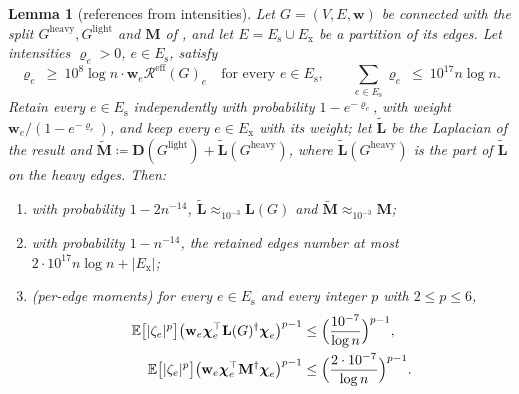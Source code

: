 \documentclass[11pt]{article}
\newtheorem{lemma}[theorem]{Lemma}
\theoremstyle{remark}
\newcommand{\cchi}{{\boldsymbol\chi}}
\newcommand{\DD}{\mathbf D}
\newcommand{\LL}{\mathbf L}
\newcommand{\LLtil}{{\widetilde{\LL}}}
\newcommand{\MM}{\mathbf M}
\newcommand{\MMtil}{{\widetilde{\MM}}}
\newcommand{\ww}{\mathbf w}
\newcommand{\Gh}{G^{\mathrm{heavy}}}
\newcommand{\Gl}{G^{\mathrm{light}}}
\newcommand{\Rcal}{\mathcal{R}}
\newcommand{\Reff}{\Rcal^{\mathrm{eff}}}
\newcommand{\defeq}{\coloneqq}
\newcommand{\Ex}{\mathbb E}
\begin{document}
\begin{lemma}[references from intensities]\label{lem:bernoulli}
Let $G=(V,E,\ww)$ be connected with the split $\Gh,\Gl$ and $\MM$ of
, and let $E=E_{\mathrm{s}}\cup E_{\mathrm{x}}$ be a partition
of its edges.
Let intensities $\varrho_e>0$, $e\in E_{\mathrm{s}}$, satisfy
\[
\varrho_e\ \ge\ 10^{8}\log n\cdot\ww_e\Reff(G)_e
\quad\text{for every }e\in E_{\mathrm{s}},
\qquad
\sum_{e\in E_{\mathrm{s}}}\varrho_e\ \le\ 10^{17}n\log n .
\]
Retain every $e\in E_{\mathrm{s}}$ independently with probability
$1-e^{-\varrho_e}$, with weight $\ww_e/(1-e^{-\varrho_e})$, and keep every
$e\in E_{\mathrm{x}}$ with its weight; let $\LLtil$ be the Laplacian of the
result and $\MMtil\defeq\DD(\Gl)+\LLtil(\Gh)$, where $\LLtil(\Gh)$ is the
part of $\LLtil$ on the heavy edges.
Then:
\begin{enumerate}[label=(\alph*),leftmargin=*]
\item with probability $1-2n^{-14}$,
$\LLtil\approx_{10^{-3}}\LL(G)$ and $\MMtil\approx_{10^{-3}}\MM$;
\item with probability $1-n^{-14}$, the retained edges number at most
$2\cdot10^{17}n\log n+|E_{\mathrm{x}}|$;
\item (per-edge moments) for every $e\in E_{\mathrm{s}}$ and every integer
$p$ with $2\le p\le6$,
\begin{align*}
\Ex\bigl[|\zeta_e|^{p}\bigr]
\bigl(\ww_e\cchi_e^{\top}\LL(G)^{\dag}\cchi_e\bigr)^{p-1}
&\le\Bigl(\frac{10^{-7}}{\log n}\Bigr)^{p-1},\\
\Ex\bigl[|\zeta_e|^{p}\bigr]
\bigl(\ww_e\cchi_e^{\top}\MM^{\dag}\cchi_e\bigr)^{p-1}
&\le\Bigl(\frac{2\cdot10^{-7}}{\log n}\Bigr)^{p-1}.
\end{align*}
\end{enumerate}
\end{lemma}
\end{document}
